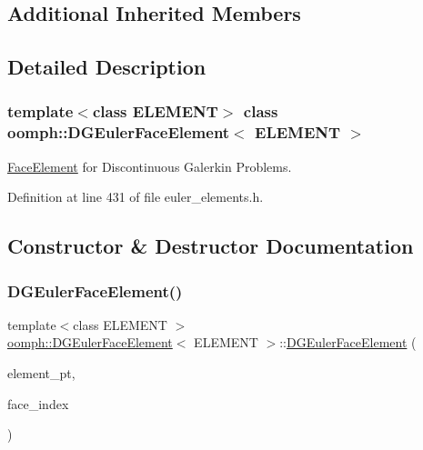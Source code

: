 \subsection*{Additional Inherited Members}


\subsection{Detailed Description}
\subsubsection*{template$<$class E\+L\+E\+M\+E\+NT$>$\newline
class oomph\+::\+D\+G\+Euler\+Face\+Element$<$ E\+L\+E\+M\+E\+N\+T $>$}

\hyperlink{classoomph_1_1FaceElement}{Face\+Element} for Discontinuous Galerkin Problems. 

Definition at line 431 of file euler\+\_\+elements.\+h.



\subsection{Constructor \& Destructor Documentation}
\mbox{\label{classoomph_1_1DGEulerFaceElement_aca3a63a2db78b06d13272c3f8f137616}} 
\subsubsection{\texorpdfstring{D\+G\+Euler\+Face\+Element()}{DGEulerFaceElement()}}
{\footnotesize\ttfamily template$<$class E\+L\+E\+M\+E\+NT $>$ \\
\hyperlink{classoomph_1_1DGEulerFaceElement}{oomph\+::\+D\+G\+Euler\+Face\+Element}$<$ E\+L\+E\+M\+E\+NT $>$\+::\hyperlink{classoomph_1_1DGEulerFaceElement}{D\+G\+Euler\+Face\+Element} (\begin{DoxyParamCaption}\item[{\hyperlink{classoomph_1_1FiniteElement}{Finite\+Element} $\ast$const \&}]{element\+\_\+pt,  }\item[{const int \&}]{face\+\_\+index }\end{DoxyParamCaption})\hspace{0.3cm}{\ttfamily [inline]}}



